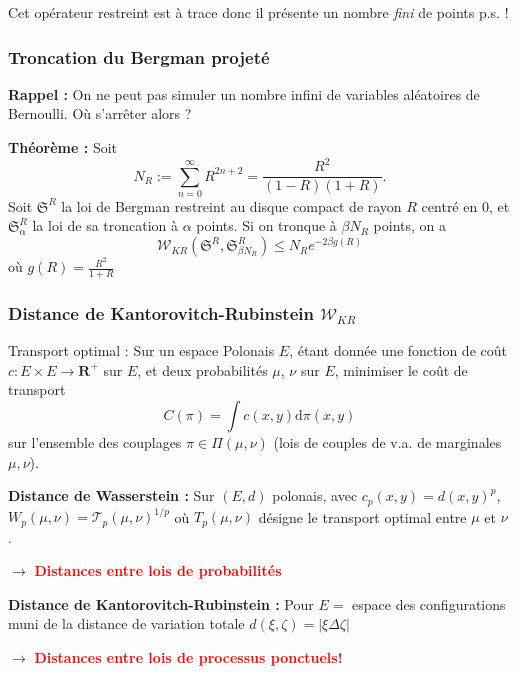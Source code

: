 \documentclass{beamer}
\begin{document}
\begin{frame}
    Cet opérateur restreint est à trace donc il présente un nombre \textit{fini} de points p.s. ! 

\end{frame}\begin{frame}\frametitle{Troncation du Bergman projeté}

    \textbf{Rappel :} On ne peut pas simuler un nombre infini de variables aléatoires de Bernoulli. Où s'arrêter alors ?

    \medskip 

    \textbf{Théorème :} Soit
    \[
    N_R := \sum_{n=0}^\infty R^{2n+2} = \frac{R^2}{(1-R)(1+R)}.
    \]
    Soit $\mathfrak{S}^R$ la loi de Bergman restreint au disque compact de rayon $R$ centré en $0$, et $\mathfrak{S}_\alpha^R$ la loi de sa troncation à $\alpha$ points. Si on tronque à $\beta N_R$ points, on a
    \[
        \mathcal{W}_{KR}(\mathfrak{S}^R, \mathfrak{S}_{\beta N_R}^R) \leqslant N_R e^{-2\beta g(R)}
    \]
    où $ g(R) = \frac{R^2}{1+R} $ 

\end{frame}\begin{frame}\frametitle{Distance de Kantorovitch-Rubinstein $ \mathcal W_{KR} $}

    Transport optimal : Sur un espace Polonais $E$, étant donnée une fonction de coût $c : E \times E \to \mathbf R^+ $ sur $E$, et deux probabilités $ \mu $, $ \nu $ sur $E$, minimiser le coût de transport $$ \displaystyle C(\pi) = \int c(x,y) \mathrm d \pi(x,y) $$ sur l'ensemble des couplages $ \pi \in \Pi(\mu,\nu)$ (lois de couples de v.a. de marginales $ \mu, \nu $).

    \textbf{Distance de Wasserstein :} Sur $(E,d)$ polonais, avec $ c_p(x,y) = d(x,y)^p $, $ W_p(\mu, \nu) = \mathcal T_p(\mu, \nu)^{1/p} $ où $ T_p(\mu, \nu) $ désigne le transport optimal entre $ \mu $ et $ \nu $ .

    \begin{center} $\rightarrow $ \textcolor{red}{\textbf{Distances entre lois de probabilités}} \end{center}

    \textbf{Distance de Kantorovitch-Rubinstein : } Pour $ E =$ espace des configurations muni de la distance de variation totale $ d(\xi, \zeta) = | \xi \Delta \zeta| $

    \begin{center} $\rightarrow $ \textcolor{red}{\textbf{Distances entre lois de processus ponctuels!}} \end{center}


\end{frame}
\end{document}
